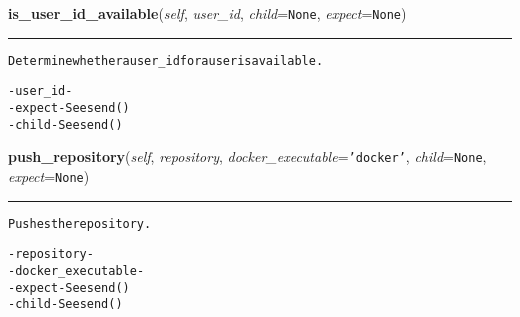 \hspace{.8\funcindent}\begin{boxedminipage}{\funcwidth}

    \raggedright \textbf{is\_user\_id\_available}(\textit{self}, \textit{user\_id}, \textit{child}={\tt None}, \textit{expect}={\tt None})

    \vspace{-1.5ex}

    \rule{\textwidth}{0.5\fboxrule}
\setlength{\parskip}{2ex}
\begin{alltt}
Determine whether a user\_id for a user is available.

- user\_id  - 
- expect   - See send()
- child    - See send()
\end{alltt}

\setlength{\parskip}{1ex}
    \end{boxedminipage}

    \label{shutit_global:ShutIt:push_repository}

    \vspace{0.5ex}

\hspace{.8\funcindent}\begin{boxedminipage}{\funcwidth}

    \raggedright \textbf{push\_repository}(\textit{self}, \textit{repository}, \textit{docker\_executable}={\tt \texttt{'}\texttt{docker}\texttt{'}}, \textit{child}={\tt None}, \textit{expect}={\tt None})

    \vspace{-1.5ex}

    \rule{\textwidth}{0.5\fboxrule}
\setlength{\parskip}{2ex}
\begin{alltt}
Pushes the repository.

- repository        - 
- docker\_executable -
- expect            - See send()
- child             - See send()
\end{alltt}

\setlength{\parskip}{1ex}
    \end{boxedminipage}

    \label{shutit_global:ShutIt:do_repository_work}

    \vspace{0.5ex}

